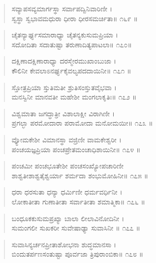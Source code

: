 \begin{verse}
ಸವ್ಯಾಪಸವ್ಯಮಾರ್ಗಸ್ಥಾ ಸರ್ವಾಪದ್ವಿನಿವಾರಿಣೀ ।\\ಸ್ವಸ್ಥಾ ಸ್ವಭಾವಮಧುರಾ ಧೀರಾ ಧೀರಸಮರ್ಚಿತಾ\num{॥ ೧೬೯ ॥}
\end{verse}

\begin{verse}
ಚೈತನ್ಯಾರ್ಘ್ಯಸಮಾರಾಧ್ಯಾ ಚೈತನ್ಯಕುಸುಮಪ್ರಿಯಾ ।\\ಸದೋದಿತಾ  ಸದಾತುಷ್ಟಾ ತರುಣಾದಿತ್ಯಪಾಟಲಾ\num{॥ ೧೭೦॥}
\end{verse}

\begin{verse}
ದಕ್ಷಿಣಾದಕ್ಷಿಣಾರಾಧ್ಯಾ ದರಸ್ಮೇರಮುಖಾಂಬುಜಾ ।\\ಕೌಲಿನೀ ಕೇವಲಾಽನರ್ಘ್ಯಕೈವಲ್ಯಪದದಾಯಿನೀ\num{॥ ೧೭೧ ॥}
\end{verse}

\begin{verse}
ಸ್ತೋತ್ರಪ್ರಿಯಾ ಸ್ತುತಿಮತೀ ಶ್ರುತಿಸಂಸ್ತುತವೈಭವಾ ।\\ಮನಸ್ವಿನೀ  ಮಾನವತೀ ಮಹೇಶೀ ಮಂಗಲಾಕೃತಿಃ\num{॥ ೧೭೨ ॥}
\end{verse}

\begin{verse}
ವಿಶ್ವಮಾತಾ ಜಗದ್ಧಾತ್ರೀ ವಿಶಾಲಾಕ್ಷೀ ವಿರಾಗಿಣೀ ।\\ಪ್ರಗಲ್ಭಾ ಪರಮೋದಾರಾ ಪರಾಮೋದಾ ಮನೋಮಯೀ\num{॥ ೧೭೩ ॥}
\end{verse}

\begin{verse}
ವ್ಯೋಮಕೇಶೀ ವಿಮಾನಸ್ಥಾ ವಜ್ರಿಣೀ ವಾಮಕೇಶ್ವರೀ ।\\ಪಂಚಯಜ್ಞಪ್ರಿಯಾ ಪಂಚಪ್ರೇತಮಂಚಾಧಿಶಾಯಿನೀ\num{॥ ೧೭೪ ॥}
\end{verse}

\begin{verse}
ಪಂಚಮೀ ಪಂಚಭೂತೇಶೀ ಪಂಚಸಂಖ್ಯೋಪಚಾರಿಣೀ \\ಶಾಶ್ವತೀಶಾಶ್ವತೈಶ್ವರ್ಯಾ ಶರ್ಮದಾ ಶಂಭುಮೋಹಿನೀ\num{॥ ೧೭೫ ॥}
\end{verse}

\begin{verse}
ಧರಾ ಧರಸುತಾ ಧನ್ಯಾ ಧರ್ಮಿಣೀ ಧರ್ಮವರ್ಧಿನೀ ।\\ಲೋಕಾತೀತಾ  ಗುಣಾತೀತಾ ಸರ್ವಾತೀತಾ ಶಮಾತ್ಮಿಕಾ\num{॥ ೧೭೬ ॥}
\end{verse}

\begin{verse}
ಬಂಧೂಕಕುಸುಮಪ್ರಖ್ಯಾ ಬಾಲಾ ಲೀಲಾವಿನೋದಿನೀ ।\\ಸುಮಂಗಲೀ ಸುಖಕರೀ ಸುವೇಷಾಢ್ಯಾ ಸುವಾಸಿನೀ \num{॥ ೧೭೭ ॥}
\end{verse}

\begin{verse}
ಸುವಾಸಿನ್ಯರ್ಚನಪ್ರೀತಾಶೋಭನಾ ಶುದ್ಧಮಾನಸಾ ।\\ಬಿಂದುತರ್ಪಣಸಂತುಷ್ಟಾ ಪೂರ್ವಜಾ ತ್ರಿಪುರಾಂಬಿಕಾ\num{॥ ೧೭೮ ॥}
\end{verse}


